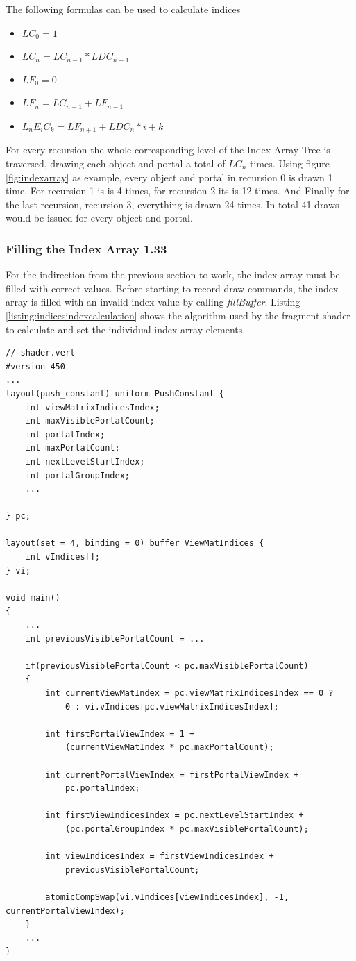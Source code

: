 The following formulas can be used to calculate indices

\begin{itemize}
	\item $LC_0 = 1$
	\item $LC_n = LC_{n-1} * LDC_{n-1}$
	\item $LF_0 = 0$
	\item $LF_n = LC_{n-1} + LF_{n-1}$
	\item $L_nE_iC_k = LF_{n+1} + LDC_{n} * i + k$
\end{itemize}

For every recursion the whole corresponding level of the Index Array Tree is traversed, drawing each object and portal a total of $LC_n$ times. Using figure \ref{fig:indexarray} as example, every object and portal in recursion 0 is drawn 1 time. For recursion 1 is is 4 times, for recursion 2 its is 12 times. And Finally for the last recursion, recursion 3, everything is drawn 24 times. In total 41 draws would be issued for every object and portal.

\subsubsection{Filling the Index Array 1.33}
For the indirection from the previous section to work, the index array must be filled with correct values. Before starting to record draw commands, the index array is filled with an invalid index value by calling \textit{fillBuffer}. Listing \ref{listing:indicesindexcalculation} shows the algorithm used by the fragment shader to calculate and set the individual index array elements.

\begin{lstlisting}[caption={Calculating Indices Index}, label=listing:indicesindexcalculation]
// shader.vert
#version 450
...
layout(push_constant) uniform PushConstant {	
	int viewMatrixIndicesIndex;
	int maxVisiblePortalCount;
	int portalIndex;
	int maxPortalCount;
	int nextLevelStartIndex;
	int portalGroupIndex;
	...

} pc;

layout(set = 4, binding = 0) buffer ViewMatIndices {
	int vIndices[];
} vi;

void main()
{
	...
	int previousVisiblePortalCount = ...
	
	if(previousVisiblePortalCount < pc.maxVisiblePortalCount)
	{
		int currentViewMatIndex = pc.viewMatrixIndicesIndex == 0 ? 
			0 : vi.vIndices[pc.viewMatrixIndicesIndex];
		
		int firstPortalViewIndex = 1 +
			(currentViewMatIndex * pc.maxPortalCount);
		
		int currentPortalViewIndex = firstPortalViewIndex +
			pc.portalIndex;
		
		int firstViewIndicesIndex = pc.nextLevelStartIndex +
			(pc.portalGroupIndex * pc.maxVisiblePortalCount);
			
		int viewIndicesIndex = firstViewIndicesIndex +
			previousVisiblePortalCount;
			
		atomicCompSwap(vi.vIndices[viewIndicesIndex], -1, currentPortalViewIndex);
	}
	...	
}

\end{lstlisting}

